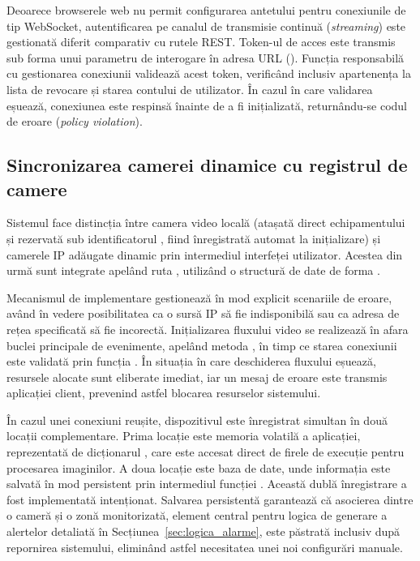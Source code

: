 \documentclass[../../main.tex]{subfiles}
\begin{document}
Deoarece browserele web nu permit configurarea antetului  pentru conexiunile de tip WebSocket, autentificarea pe canalul de transmisie continuă (\emph{streaming}) este gestionată diferit comparativ cu rutele REST. Token-ul de acces este transmis sub forma unui parametru de interogare în adresa URL (). Funcția responsabilă cu gestionarea conexiunii validează acest token, verificând inclusiv apartenența la lista de revocare și starea contului de utilizator. În cazul în care validarea eșuează, conexiunea este respinsă înainte de a fi inițializată, returnându-se codul de eroare  (\emph{policy violation}).

\subsection{Sincronizarea camerei dinamice cu registrul de camere}
\label{subsec:sincronizare_camere}

Sistemul face distincția între camera video locală (atașată direct echipamentului și rezervată sub identificatorul , fiind înregistrată automat la inițializare) și camerele IP adăugate dinamic prin intermediul interfeței utilizator. Acestea din urmă sunt integrate apelând ruta , utilizând o structură de date de forma .

Mecanismul de implementare gestionează în mod explicit scenariile de eroare, având în vedere posibilitatea ca o sursă IP să fie indisponibilă sau ca adresa de rețea specificată să fie incorectă. Inițializarea fluxului video se realizează în afara buclei principale de evenimente, apelând metoda  \linebreak {} , în timp ce starea conexiunii este validată prin funcția . În situația în care deschiderea fluxului eșuează, resursele alocate sunt eliberate imediat, iar un mesaj de eroare este transmis aplicației client, prevenind astfel blocarea resurselor sistemului.

În cazul unei conexiuni reușite, dispozitivul este înregistrat simultan în două locații complementare. Prima locație este memoria volatilă a aplicației, reprezentată de dicționarul , care este accesat direct de firele de execuție pentru procesarea imaginilor. A doua locație este baza de date, unde informația este salvată în mod persistent prin intermediul funcției  \linebreak {}. Această dublă înregistrare a fost implementată intenționat. Salvarea persistentă garantează că asocierea dintre o cameră și o zonă monitorizată, element central pentru logica de generare a alertelor detaliată în Secțiunea~\ref{sec:logica_alarme}, este păstrată inclusiv după repornirea sistemului, eliminând astfel necesitatea unei noi configurări manuale.
\end{document}
